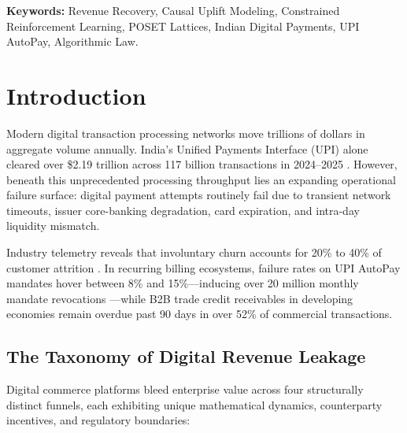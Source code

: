 \documentclass[10pt, twocolumn, a4paper]{article}
\begin{document}
\noindent\textbf{Keywords:} Revenue Recovery, Causal Uplift Modeling, Constrained Reinforcement Learning, POSET Lattices, Indian Digital Payments, UPI AutoPay, Algorithmic Law.

\section{Introduction}

Modern digital transaction processing networks move trillions of dollars in aggregate volume annually. India's Unified Payments Interface (UPI) alone cleared over \$2.19 trillion across 117 billion transactions in 2024--2025 \citep{npci2024survey}. However, beneath this unprecedented processing throughput lies an expanding operational failure surface: digital payment attempts routinely fail due to transient network timeouts, issuer core-banking degradation, card expiration, and intra-day liquidity mismatch. 

Industry telemetry reveals that involuntary churn accounts for 20\% to 40\% of customer attrition \citep{gocardless2023, stripe2024churn}. In recurring billing ecosystems, failure rates on UPI AutoPay mandates hover between 8\% and 15\%---inducing over 20 million monthly mandate revocations \citep{bs2025mandates}---while B2B trade credit receivables in developing economies remain overdue past 90 days in over 52\% of commercial transactions.

\subsection{The Taxonomy of Digital Revenue Leakage}
Digital commerce platforms bleed enterprise value across four structurally distinct funnels, each exhibiting unique mathematical dynamics, counterparty incentives, and regulatory boundaries:
\end{document}
